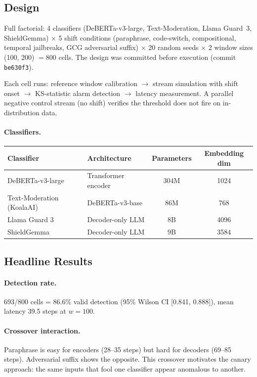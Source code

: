 \documentclass{article}
\begin{document}
\subsection{Design}

Full factorial: 4 classifiers (DeBERTa-v3-large, Text-Moderation, Llama Guard~3, ShieldGemma) $\times$ 5 shift conditions (paraphrase, code-switch, compositional, temporal jailbreaks, GCG adversarial suffix) $\times$ 20 random seeds $\times$ 2 window sizes (100, 200) $= 800$ cells. The design was committed before execution (commit \texttt{be630f3}).

Each cell runs: reference window calibration $\to$ stream simulation with shift onset $\to$ KS-statistic alarm detection $\to$ latency measurement. A parallel negative control stream (no shift) verifies the threshold does not fire on in-distribution data.

\paragraph{Classifiers.}

\begin{table}[h]
\centering
\small
\begin{tabular}{llcc}
\toprule
\textbf{Classifier} & \textbf{Architecture} & \textbf{Parameters} & \textbf{Embedding dim} \\
\midrule
DeBERTa-v3-large & Transformer encoder & 304M & 1024 \\
Text-Moderation (KoalaAI) & DeBERTa-v3-base & 86M & 768 \\
Llama Guard 3 & Decoder-only LLM & 8B & 4096 \\
ShieldGemma & Decoder-only LLM & 9B & 3584 \\
\bottomrule
\end{tabular}
\end{table}

\subsection{Headline Results}

\paragraph{Detection rate.} 693/800 cells = 86.6\% valid detection (95\% Wilson CI [0.841, 0.888]), mean latency 39.5 steps at $w{=}100$.

\paragraph{Crossover interaction.} Paraphrase is easy for encoders (28--35 steps) but hard for decoders (69--85 steps). Adversarial suffix shows the opposite. This crossover motivates the canary approach: the same inputs that fool one classifier appear anomalous to another.
\end{document}
